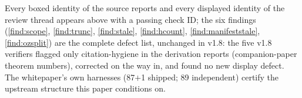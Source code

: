 \documentclass[11pt]{article}
\theoremstyle{plain}
\theoremstyle{definition}
\theoremstyle{remark}
\begin{document}
\smallskip\noindent
Every boxed identity of the source reports and every displayed identity of the
review thread appears above with a passing check ID; the six findings
(\ref{find:scope}, \ref{find:trunc}, \ref{find:stale}, \ref{find:hcount},
\ref{find:manifeststale}, \ref{find:ozsplit})
are the complete defect list, unchanged in v1.8: the five v1.8 verifiers
flagged only citation-hygiene in the derivation reports (companion-paper
theorem numbers), corrected on the way in, and found no new display defect. The
whitepaper's own harnesses (87$+$1 shipped; 89 independent) certify the upstream
structure this paper conditions on.
\end{document}
